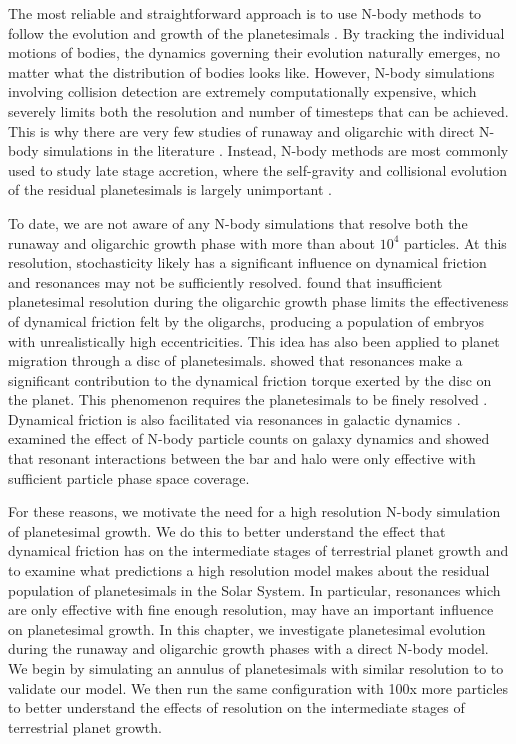 The most reliable and straightforward approach is to use N-body methods to follow the evolution and growth of the planetesimals 
\cite{lecar86}. By tracking the individual motions of bodies, the dynamics governing their evolution naturally emerges, no matter 
what the distribution of bodies looks like. However, N-body simulations involving collision detection are extremely 
computationally expensive, which severely limits both the resolution and number of timesteps that can be achieved. This is why 
there are very few studies of runaway and oligarchic with direct N-body simulations in the literature 
\cite{kokubo96, kokubo98, kokubo02, barnes09}. Instead, N-body methods are most commonly used to study late stage 
accretion, where the self-gravity and collisional evolution of the residual planetesimals is largely unimportant 
\cite{chambers98, agnor99,  chambers01, obrien06, morbidelli09}.

To date, we are not aware of any N-body simulations that resolve both the runaway and oligarchic growth phase  with more than 
about $10^4$ particles. At this resolution, stochasticity likely has a significant influence on dynamical friction and resonances 
may not be sufficiently resolved. \cite{raymond06} found that insufficient planetesimal resolution during the oligarchic growth 
phase limits the effectiveness of dynamical friction felt by the oligarchs, producing a population of embryos with unrealistically 
high eccentricities. This idea has also been applied to planet migration through a disc of planetesimals. \cite{cionco02} showed 
that resonances make a significant contribution to the dynamical friction torque exerted by the disc on the planet. This 
phenomenon requires the planetesimals to be finely resolved \cite{brunini07}. Dynamical friction is also facilitated via 
resonances in galactic dynamics \cite{lyndenbell72}. \cite{weinberg07a, weinberg07b} examined the effect of N-body particle 
counts on galaxy dynamics and showed that resonant interactions between the bar and halo were only effective with sufficient 
particle phase space coverage.

For these reasons, we motivate the need for a high resolution N-body simulation of planetesimal growth. We do this to better 
understand the effect that dynamical friction has on the intermediate stages of terrestrial planet growth and to examine what 
predictions a high resolution model makes about the residual population of planetesimals in the Solar System. In particular, 
resonances which are only effective with fine enough resolution, may have an important influence on planetesimal growth. In this 
chapter, we investigate planetesimal evolution during the runaway and oligarchic growth phases with a direct N-body model. We 
begin by simulating an annulus of planetesimals with similar resolution to \cite{kokubo98} to validate our model. We then run the 
same configuration with 100x more particles to better understand the effects of resolution on the intermediate stages of 
terrestrial planet growth.


